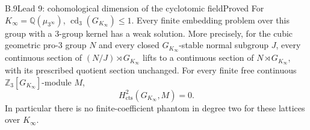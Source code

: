 \begin{statement}{B.9}{Lead 9: cohomological dimension of the cyclotomic field}{Proved}
For $K_\infty=\mathbb Q(\mu_{3^\infty})$,
$\operatorname{cd}_3(G_{K_\infty})\leq1$.
Every finite embedding problem over this group with a $3$-group
kernel has a weak solution. More precisely, for the cubic
geometric pro-$3$ group $N$ and every closed
$G_{K_\infty}$-stable normal subgroup $J$, every continuous
section of $(N/J)\rtimes G_{K_\infty}$ lifts to a continuous
section of $N\rtimes G_{K_\infty}$, with its prescribed
quotient section unchanged. For every finite free continuous
$\mathbb Z_3[G_{K_\infty}]$-module $M$,
\[
                  H^2_{\mathrm{cts}}(G_{K_\infty},M)=0.
\]
In particular there is no finite-coefficient phantom in
degree two for these lattices over $K_\infty$.
\end{statement}
